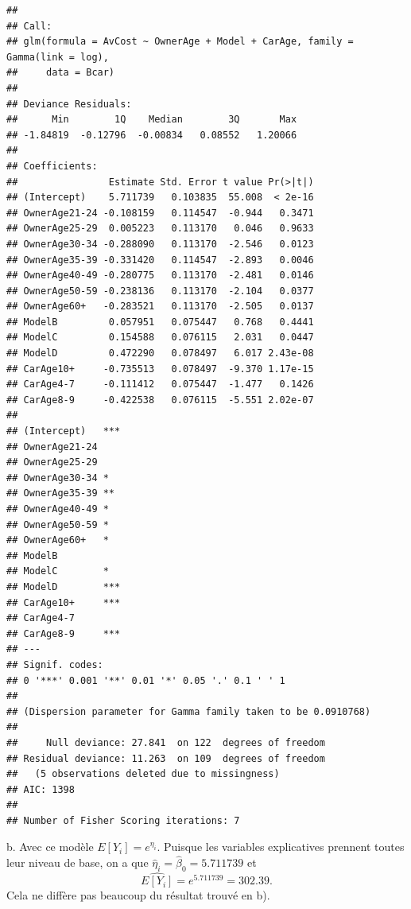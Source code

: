 \begin{solution}{5.8}
\begin{enumerate}
\begin{knitrout}
\color{fgcolor}\begin{kframe}
\begin{alltt}
 \hlkwb{<-} \hlopt{~}\hlopt{+}\hlopt{+}\hlstd{=}\hlstd{(}
\end{alltt}
\begin{verbatim}
##
## Call:
## glm(formula = AvCost ~ OwnerAge + Model + CarAge, family = Gamma(link = log),
##     data = Bcar)
##
## Deviance Residuals:
##      Min        1Q    Median        3Q       Max
## -1.84819  -0.12796  -0.00834   0.08552   1.20066
##
## Coefficients:
##                Estimate Std. Error t value Pr(>|t|)
## (Intercept)    5.711739   0.103835  55.008  < 2e-16
## OwnerAge21-24 -0.108159   0.114547  -0.944   0.3471
## OwnerAge25-29  0.005223   0.113170   0.046   0.9633
## OwnerAge30-34 -0.288090   0.113170  -2.546   0.0123
## OwnerAge35-39 -0.331420   0.114547  -2.893   0.0046
## OwnerAge40-49 -0.280775   0.113170  -2.481   0.0146
## OwnerAge50-59 -0.238136   0.113170  -2.104   0.0377
## OwnerAge60+   -0.283521   0.113170  -2.505   0.0137
## ModelB         0.057951   0.075447   0.768   0.4441
## ModelC         0.154588   0.076115   2.031   0.0447
## ModelD         0.472290   0.078497   6.017 2.43e-08
## CarAge10+     -0.735513   0.078497  -9.370 1.17e-15
## CarAge4-7     -0.111412   0.075447  -1.477   0.1426
## CarAge8-9     -0.422538   0.076115  -5.551 2.02e-07
##
## (Intercept)   ***
## OwnerAge21-24
## OwnerAge25-29
## OwnerAge30-34 *
## OwnerAge35-39 **
## OwnerAge40-49 *
## OwnerAge50-59 *
## OwnerAge60+   *
## ModelB
## ModelC        *
## ModelD        ***
## CarAge10+     ***
## CarAge4-7
## CarAge8-9     ***
## ---
## Signif. codes:
## 0 '***' 0.001 '**' 0.01 '*' 0.05 '.' 0.1 ' ' 1
##
## (Dispersion parameter for Gamma family taken to be 0.0910768)
##
##     Null deviance: 27.841  on 122  degrees of freedom
## Residual deviance: 11.263  on 109  degrees of freedom
##   (5 observations deleted due to missingness)
## AIC: 1398
##
## Number of Fisher Scoring iterations: 7
\end{verbatim}
\end{kframe}
\end{knitrout}

b. Avec ce modèle $E[Y_i]=e^{\eta_i}.$ Puisque les variables explicatives prennent toutes leur niveau de base, on a que $\hat{\eta}_i=\hat{\beta}_0=5.711739$ et $$\widehat{E[Y_i]}=e^5.711739=302.39.$$ Cela ne diffère pas beaucoup du résultat trouvé en b).


\end{enumerate}
\end{solution}
